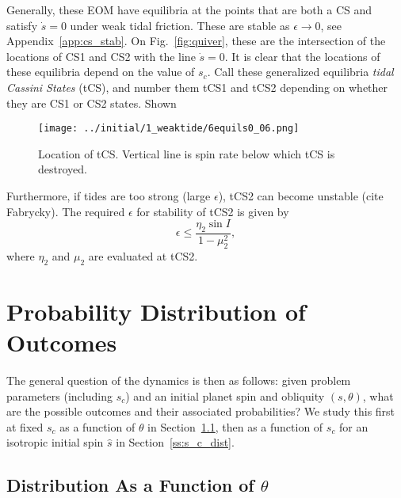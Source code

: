 \documentclass[
        fleqn,
        usenatbib,
        referee,
    ]{mnras}
\begin{document}
Generally, these EOM have equilibria at the points that are both a CS and
satisfy $\dot{s} = 0$ under weak tidal friction. These are stable as $\epsilon
\to 0$, see Appendix~\ref{app:cs_stab}. On Fig.~\ref{fig:quiver}, these are the
intersection of the locations of CS1 and CS2 with the line $\dot{s} = 0$. It is
clear that the locations of these equilibria depend on the value of $s_c$. Call
these generalized equilibria \emph{tidal Cassini States} (tCS), and number them
tCS1 and tCS2 depending on whether they are CS1 or CS2 states. Shown
\begin{figure}
    \centering
    \texttt{[image: ../initial/1\_weaktide/6equils0\_06.png]}
    \caption{Location of tCS\@. Vertical line is spin rate below which tCS is
    destroyed.}\label{fig:6equils}
\end{figure}

Furthermore, if tides are too strong (large $\epsilon$), tCS2 can become
unstable (cite Fabrycky). The required $\epsilon$ for stability of tCS2 is given
by
\begin{equation}
    \epsilon \leq \frac{\eta_2 \sin I}{1 - \mu_2^2},
\end{equation}
where $\eta_2$ and $\mu_2$ are evaluated at tCS2.

\section{Probability Distribution of Outcomes}\label{s:sim}

The general question of the dynamics is then as follows: given problem
parameters (including $s_c$) and an initial planet spin and obliquity $(s,
\theta)$, what are the possible outcomes and their associated probabilities? We
study this first at fixed $s_c$ as a function of $\theta$ in
Section~\ref{ss:q_dist}, then as a function of $s_c$ for an isotropic initial
spin $\hat{s}$ in Section~\ref{ss:s_c_dist}.

\subsection{Distribution As a Function of $\theta$}\label{ss:q_dist}
\end{document}
